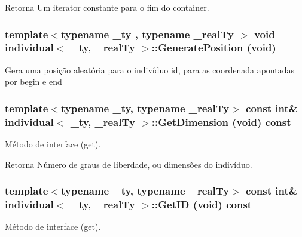 \begin{DoxyReturn}{Retorna}
Um iterator constante para o fim do container. 
\end{DoxyReturn}
\hypertarget{classindividual_a64d3b068c2c4e652a93051ab261b06eb}{
\subsubsection[{GeneratePosition}]{\setlength{\rightskip}{0pt plus 5cm}template$<$typename \_\-ty , typename \_\-realTy $>$ void {\bf individual}$<$ \_\-ty, \_\-realTy $>$::GeneratePosition (void)}}
\label{classindividual_a64d3b068c2c4e652a93051ab261b06eb}
Gera uma posição aleatória para o indivíduo id, para as coordenada apontadas por begin e end \hypertarget{classindividual_a2142383da99c87d1f2dac7fccd4565d8}{
\subsubsection[{GetDimension}]{\setlength{\rightskip}{0pt plus 5cm}template$<$typename \_\-ty, typename \_\-realTy$>$ const int\& {\bf individual}$<$ \_\-ty, \_\-realTy $>$::GetDimension (void) const}}
\label{classindividual_a2142383da99c87d1f2dac7fccd4565d8}
Método de interface (get).

\begin{DoxyReturn}{Retorna}
Número de graus de liberdade, ou dimensões do indivíduo. 
\end{DoxyReturn}
\hypertarget{classindividual_aec666131664fc884367d321cde07a586}{
\subsubsection[{GetID}]{\setlength{\rightskip}{0pt plus 5cm}template$<$typename \_\-ty, typename \_\-realTy$>$ const int\& {\bf individual}$<$ \_\-ty, \_\-realTy $>$::GetID (void) const}}
\label{classindividual_aec666131664fc884367d321cde07a586}
Método de interface (get).

